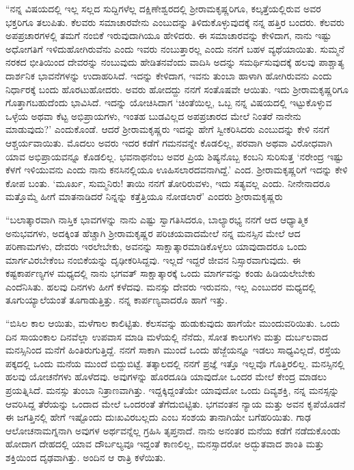 “ನನ್ನ ವಿಷಯದಲ್ಲಿ ಇಲ್ಲ ಸಲ್ಲದ ಸುದ್ದಿಗಳೆಲ್ಲ ದಕ್ಷಿಣೇಶ್ವರದಲ್ಲಿ ಶ‍್ರೀರಾಮಕೃಷ್ಣರಿಗೂ, ಕಲ್ಕತ್ತೆಯಲ್ಲಿರುವ ಅವರ ಭಕ್ತರಿಗೂ ತಲುಪಿತು. ಕೆಲವರು ಸಮಾಚಾರವೇನು ಎಂಬುದನ್ನು ತಿಳಿದುಕೊಳ್ಳುವುದಕ್ಕೆ ನನ್ನ ಹತ್ತಿರ ಬಂದರು. ಕೆಲವರು ಅಪಪ್ರಚಾರಗಳಲ್ಲಿ ತಮಗೆ ನಂಬಿಕೆ ಇರುವುದಾಗಿಯೂ ಹೇಳಿದರು. ಈ ಸಮಾಚಾರವನ್ನು ಕೇಳಿದಾಗ, ನಾನು ಇಷ್ಟು ಅಧೋಗತಿಗೆ ಇಳಿದುಹೋಗಿರುವೆನು ಎಂದು ಇವರು ನಂಬುತ್ತಾರಲ್ಲ ಎಂದು ನನಗೆ ಬಹಳ ವ್ಯಥೆಯಾಯಿತು. ಸುಮ್ಮನೆ ನರಕದ ಭೀತಿಯಿಂದ ದೇವರನ್ನು ನಂಬುವುದು ಹೇಡಿತನವೆಂದು ವಾದಿಸಿ ಅದನ್ನು ಸಮರ್ಥಿಸುವುದಕ್ಕೆ ಹಲವು ಪಾಶ್ಚಾತ್ಯ ದಾರ್ಶನಿಕ ಭಾವನೆಗಳನ್ನು ಉದಾಹರಿಸಿದೆ. ಇದನ್ನು ಕೇಳಿದಾಗ, ಇವನು ತುಂಬಾ ಹಾಳಾಗಿ ಹೋಗಿರುವನು ಎಂದು ನಿರ್ಧಾರಕ್ಕೆ ಬಂದು ಹೊರಟುಹೋದರು. ಅವರು ಹೋದದ್ದು ನನಗೆ ಸಂತೊಷವೇ ಆಯಿತು. ಇದು ಶ‍್ರೀರಾಮಕೃಷ್ಣರಿಗೂ ಗೊತ್ತಾಗಬಹುದೆಂದು ಭಾವಿಸಿದೆ. ಇದನ್ನು ಯೋಚಿಸಿದಾಗ ‘ಚಿಂತೆಯಿಲ್ಲ, ಒಬ್ಬ ನನ್ನ ವಿಷಯದಲ್ಲಿ ಇಟ್ಟುಕೊಳ್ಳುವ ಒಳ್ಳೆಯ ಅಥವಾ ಕೆಟ್ಟ ಅಭಿಪ್ರಾಯಗಳು, ಇಂತಹ ಬುಡವಿಲ್ಲದ ಅಪಪ್ರಚಾರದ ಮೇಲೆ ನಿಂತರೆ ನಾನೇನು ಮಾಡುವುದು?’ ಎಂದುಕೊಂಡೆ. ಆದರೆ ಶ‍್ರೀರಾಮಕೃಷ್ಣರು ಇದನ್ನು ಹೇಗೆ ಸ್ವೀಕರಿಸಿದರು ಎಂಬುದನ್ನು ಕೇಳಿ ನನಗೆ ಆಶ್ಚರ್ಯವಾಯಿತು. ಮೊದಲು ಅವರು ಇದರ ಕಡೆಗೆ ಗಮನವನ್ನೇ ಕೊಡಲಿಲ್ಲ, ಪರವಾಗಿ ಅಥವಾ ವಿರೋಧವಾಗಿ ಯಾವ ಅಭಿಪ್ರಾಯವನ್ನೂ ಕೊಡಲಿಲ್ಲ. ಭವನಾಥನೆಂಬ ಅವರ ಪ್ರಿಯ ಶಿಷ್ಯನೊಬ್ಬ ಕಂಬನಿ ಸುರಿಸುತ್ತ ‘ನರೇಂದ್ರ ಇಷ್ಟು ಕೆಳಗೆ ಇಳಿಯುವನು ಎಂದು ನಾನು ಕನಸಿನಲ್ಲಿಯೂ ಊಹಿಸಲಾರದವನಾಗಿದ್ದೆ.’ ಎಂದ. ಶ‍್ರೀರಾಮಕೃಷ್ಣರಿಗೆ ಇದನ್ನು ಕೇಳಿ ಕೋಪ ಬಂತು. ‘ಮೂರ್ಖ, ಸುಮ್ಮನಿರು! ತಾಯಿ ನನಗೆ ತೋರಿರುವಳು, ಇದು ಸತ್ಯವಲ್ಲ ಎಂದು. ನೀನೇನಾದರೂ ಮತ್ತೊಮ್ಮೆ ಹೀಗೆ ಮಾತನಾಡಿದರೆ ನಿನ್ನನ್ನು ಕತ್ತೆತ್ತಿಯೂ ನೋಡಲಾರೆ’ ಎಂದರು ಶ‍್ರೀರಾಮಕೃಷ್ಣರು

“ಬಲಾತ್ಕಾರವಾಗಿ ನಾಸ್ತಿಕ ಭಾವಗಳನ್ನು ನಾನು ಎಷ್ಟು ಸ್ವಾಗತಿಸಿದರೂ, ಬಾಲ್ಯಾರಭ್ಯ ನನಗೆ ಆದ ಆಧ್ಯಾತ್ಮಿಕ ಅನುಭವಗಳು, ಅದಕ್ಕಿಂತ ಹೆಚ್ಚಾಗಿ ಶ‍್ರೀರಾಮಕೃಷ್ಣರ ಪರಿಚಯವಾದಮೇಲೆ ನನ್ನ ಮನಸ್ಸಿನ ಮೇಲೆ ಆದ ಪರಿಣಾಮಗಳು, ದೇವರು ಇರಲೇಬೇಕು, ಅವನನ್ನು ಸಾಕ್ಷಾತ್ಕಾರಮಾಡಿಕೊಳ್ಳಲು ಯಾವುದಾದರೂ ಒಂದು ಮಾರ್ಗವಿರಬೇಕೆಂಬ ನಂಬಿಕೆಯನ್ನು ದೃಢೀಕರಿಸಿದ್ದವು. ಇಲ್ಲದೆ ಇದ್ದರೆ ಜೀವನ ನಿಸ್ಸಾರವಾಗುವುದು. ಈ ಕಷ್ಟಕಾರ್ಪಣ್ಯಗಳ ಮಧ್ಯದಲ್ಲಿ ನಾನು ಭಗವತ್ ಸಾಕ್ಷಾತ್ಕಾರಕ್ಕೆ ಒಂದು ಮಾರ್ಗವನ್ನು ಕಂಡು ಹಿಡಿಯಲೇಬೇಕು ಎಂದೆನಿಸಿತು. ಹಲವು ದಿನಗಳು ಹೀಗೆ ಕಳೆದವು. ಮನಸ್ಸು ದೇವರು ಇರುವನು, ಇಲ್ಲ ಎಂಬುದರ ಮಧ್ಯದಲ್ಲಿ ತೂಗುಯ್ಯಾಲೆಯಂತೆ ತೂಗಾಡುತ್ತಿತ್ತು. ನನ್ನ ಕಾರ್ಪಣ್ಯವಾದರೊ ಹಾಗೆ ಇತ್ತು.

\vskip  3pt

“ಬಿಸಿಲ ಕಾಲ ಆಯಿತು, ಮಳೆಗಾಲ ಕಾಲಿಟ್ಟಿತು. ಕೆಲಸವನ್ನು ಹುಡುಕುವುದು ಹಾಗೆಯೇ ಮುಂದುವರಿಯಿತು. ಒಂದು ದಿನ ಸಾಯಂಕಾಲ ದಿನವೆಲ್ಲಾ ಉಪವಾಸ ಮಾಡಿ ಮಳೆಯಲ್ಲಿ ನೆನೆದು, ಸೋತ ಕಾಲುಗಳು ಮತ್ತು ದುರ್ಬಲವಾದ ಮನಸ್ಸಿನಿಂದ ಮನೆಗೆ ಹಿಂತಿರುಗುತ್ತಿದ್ದೆ. ನನಗೆ ಸಾಕಾಗಿ ಮುಂದೆ ಒಂದು ಹೆಜ್ಜೆಯನ್ನೂ ಇಡಲು ಸಾಧ್ಯವಿಲ್ಲದೆ, ರಸ್ತೆಯ ಪಕ್ಕದಲ್ಲಿ ಒಂದು ಮನೆಯ ಮುಂದೆ ಬಿದ್ದುಬಿಟ್ಟೆ. ತತ್ಕಾಲದಲ್ಲಿ ನನಗೆ ಪ್ರಜ್ಞೆ ಇತ್ತೊ ಇಲ್ಲವೊ ಗೊತ್ತಿರಲಿಲ್ಲ. ಮನಸ್ಸಿನಲ್ಲಿ ಹಲವು ಯೋಚನೆಗಳು ಹೊಳೆದವು. ಅವುಗಳನ್ನು ಹೊರದೂಡಿ ಯಾವುದೋ ಒಂದರ ಮೇಲೆ ಕೇಂದ್ರ ಮಾಡಲು ಪ್ರಯತ್ನಿಸಿದೆ. ಮನಸ್ಸು ತುಂಬಾ ನಿತ್ರಾಣವಾಗಿತ್ತು. ಇದ್ದಕ್ಕಿದ್ದಂತೆಯೇ ಯಾವುದೋ ಒಂದು ದಿವ್ಯಶಕ್ತಿ, ನನ್ನ ಮನಸ್ಸನ್ನು ಆವರಿಸಿದ್ದ ತೆರೆಯನ್ನು ಒಂದಾದ ಮೇಲೆ ಒಂದರಂತೆ ತೆಗೆದುಬಿಟ್ಟಿತು. ಭಗವಂತನ ನ್ಯಾಯ ಮತ್ತು ಅವನ ಕೃಪೆಯೊಡನೆ ಈ ಜಗತ್ತಿನಲ್ಲಿ ಹೇಗೆ ಇಷ್ಟೊಂದು ದುಃಖವಿರಬಲ್ಲದು ಎಂಬ ಸಂಶಯ ತಾನಾಗಿಯೇ ಬಗೆಹರಿಯಿತು. ಗಾಢ ಆಲೋಚನಾಮಗ್ನನಾಗಿ ಅವುಗಳ ಅರ್ಥವನ್ನೆಲ್ಲ ಗ್ರಹಿಸಿ ತೃಪ್ತನಾದೆ. ನಾನು ಅನಂತರ ಮನೆಯ ಕಡೆಗೆ ನಡೆದುಕೊಂಡು ಹೋದಾಗ ದೇಹದಲ್ಲಿ ಯಾವ ದೌರ್ಬಲ್ಯವೂ ಇದ್ದಂತೆ ಕಾಣಲಿಲ್ಲ, ಮನಸ್ಸಾದರೋ ಅದ್ಭುತವಾದ ಶಾಂತಿ ಮತ್ತು ಶಕ್ತಿಯಿಂದ ದೃಢವಾಗಿತ್ತು. ಅಂದಿನ ಆ ರಾತ್ರಿ ಕಳೆಯಿತು.

